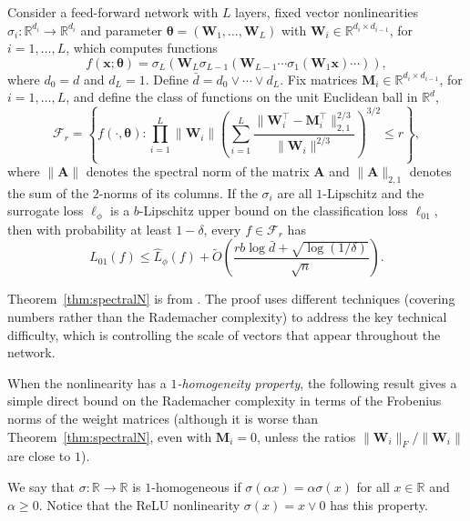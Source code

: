 \begin{theorem}\label{thm:spectralN}
Consider a feed-forward network with $L$ layers, fixed vector nonlinearities $\sigma_i:{\mathbb R}^{d_i}\to{\mathbb R}^{d_i}$ and parameter
${\boldsymbol \theta}=({\boldsymbol W}_1,\ldots,{\boldsymbol W}_L)$ with
${\boldsymbol W}_i\in{\mathbb R}^{d_i\times d_{i-1}}$, for $i=1,\ldots,L$,
which computes functions
  \[
    f({\boldsymbol x};{\boldsymbol \theta}) =
      \sigma_L({\boldsymbol W}_L\sigma_{L-1}({\boldsymbol W}_{L-1} \cdots \sigma_1({\boldsymbol W}_1{\boldsymbol x})\cdots)),
  \]
where $d_0=d$ and $d_L=1$. Define $\bar d =d_0\vee\cdots\vee d_L$. Fix matrices ${\boldsymbol M}_i\in{\mathbb R}^{d_i\times d_{i-1}}$, for $i=1,\ldots,L$, and define the class of functions on the unit Euclidean ball in ${\mathbb R}^d$,
  \[
    {\mathcal F}_r = \left\{f(\cdot,{\boldsymbol \theta}): \prod_{i=1}^L \|{\boldsymbol W}_i\| \left(\sum_{i=1}^L
    \frac{\|{\boldsymbol W}_i^\top-{\boldsymbol M}_i^\top\|_{2,1}^{2/3}}{\|{\boldsymbol W}_i\|^{2/3}}
    \right)^{3/2}\le r \right\},
  \]
where $\|{\boldsymbol A}\|$ denotes the spectral norm of the matrix ${\boldsymbol A}$ and
$\|{\boldsymbol A}\|_{2,1}$ denotes the sum of the $2$-norms of its columns. If the $\sigma_i$ are all $1$-Lipschitz and the surrogate loss $\ell_\phi$ is a $b$-Lipschitz upper bound on the classification loss $\ell_{01}$, then with probability at least $1-\delta$, every
$f\in {\mathcal F}_r$ has
  \[
    L_{01}(f) \le \widehat L_{\phi}(f)
      + \tilde O\left(\frac{rb\log\bar d
      +\sqrt{\log(1/\delta)}}{\sqrt{n}}\right).
  \]
\end{theorem}

Theorem~\ref{thm:spectralN} is from \cite{snmbnn-manng-17}. The proof uses different techniques (covering numbers rather than the Rademacher complexity) to address the key technical difficulty, which is controlling the scale of vectors that appear throughout the network.

When the nonlinearity has a {\em $1$-homogeneity property}, the following result gives a simple direct bound on the Rademacher complexity in terms of the Frobenius norms of the weight matrices (although it is worse than Theorem~\ref{thm:spectralN}, even with
${\boldsymbol M}_i=0$, unless the ratios $\|{\boldsymbol W}_i\|_F/\|{\boldsymbol W}_i\|$ are close to $1$).

We say that $\sigma:{\mathbb R}\to{\mathbb R}$ is $1$-homogeneous if $\sigma(\alpha x) = \alpha\sigma(x)$ for all $x\in{\mathbb R}$ and
$\alpha\ge 0$.  Notice that the ReLU nonlinearity $\sigma(x)=x\vee 0$ has this property.

